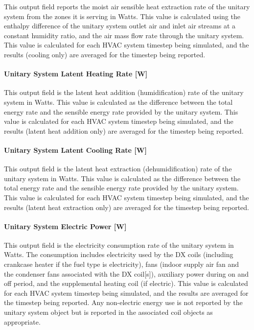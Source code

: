 This output field reports the moist air sensible heat extraction rate of the unitary system from the zones it is serving in Watts. This value is calculated using the enthalpy difference of the unitary system outlet air and inlet air streams at a constant humidity ratio, and the air mass flow rate through the unitary system. This value is calculated for each HVAC system timestep being simulated, and the results (cooling only) are averaged for the timestep being reported.

\paragraph{Unitary System Latent Heating Rate {[}W{]}}\label{unitary-system-latent-heating-rate-w}

This output field is the latent heat addition (humidification) rate of the unitary system in Watts. This value is calculated as the difference between the total energy rate and the sensible energy rate provided by the unitary system. This value is calculated for each HVAC system timestep being simulated, and the results (latent heat addition only) are averaged for the timestep being reported.

\paragraph{Unitary System Latent Cooling Rate {[}W{]}}\label{unitary-system-latent-cooling-rate-w}

This output field is the latent heat extraction (dehumidification) rate of the unitary system in Watts. This value is calculated as the difference between the total energy rate and the sensible energy rate provided by the unitary system. This value is calculated for each HVAC system timestep being simulated, and the results (latent heat extraction only) are averaged for the timestep being reported.

\paragraph{Unitary System Electric Power {[}W{]}}\label{unitary-system-electric-power-w}

This output field is the electricity consumption rate of the unitary system in Watts. The consumption includes electricity used by the DX coils (including crankcase heater if the fuel type is electricity), fans (indoor supply air fan and the condenser fans associated with the DX coil{[}s{]}), auxiliary power during on and off period, and the supplemental heating coil (if electric). This value is calculated for each HVAC system timestep being simulated, and the results are averaged for the timestep being reported. Any non-electric energy use is not reported by the unitary system object but is reported in the associated coil objects as appropriate.

